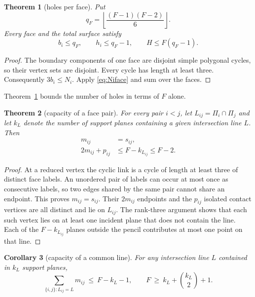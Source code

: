 \documentclass[11pt,a4paper]{article}
\newtheorem{theorem}{Theorem}[section]
\newtheorem{corollary}[theorem]{Corollary}
\theoremstyle{definition}
\begin{document}
\begin{theorem}[holes per face]\label{thm:arr-holes}
Put
\[
  q_F=\left\lfloor\frac{(F-1)(F-2)}6\right\rfloor.
\]
Every face and the total surface satisfy
\begin{equation}\label{eq:arr-holes}
  b_i\leq q_F,
  \qquad
  h_i\leq q_F-1,
  \qquad
  H\leq F(q_F-1).
\end{equation}
\end{theorem}

\begin{proof}
The boundary components of one face are disjoint simple polygonal cycles, so
their vertex sets are disjoint.  Every cycle has length at least three.
Consequently $3b_i\leq N_i$.  Apply \eqref{eq:Niface} and sum over the
faces.
\end{proof}

Theorem~\ref{thm:arr-holes} bounds the number of holes in terms of $F$ alone.

\begin{theorem}[capacity of a face pair]\label{thm:paircapacity}
For every pair $i<j$, let $L_{ij}=\Pi_i\cap\Pi_j$ and let $k_L$ denote the
number of support planes containing a given intersection line $L$. Then
\begin{align}
  m_{ij}&=s_{ij},\label{eq:edgepair}\\
  2m_{ij}+p_{ij}&\leq F-k_{L_{ij}}\leq F-2.\label{eq:contactcapacity}
\end{align}
\end{theorem}

\begin{proof}
At a reduced vertex the cyclic link is a cycle of length at least three of
distinct face labels. An unordered pair of labels can occur at most once as
consecutive labels, so two edges shared by the same pair cannot share an
endpoint. This proves $m_{ij}=s_{ij}$. Their $2m_{ij}$ endpoints and the
$p_{ij}$ isolated contact vertices are all distinct and lie on $L_{ij}$.
The rank-three argument shows that each such vertex lies on at least one
incident plane that does not contain the line. Each of the $F-k_{L_{ij}}$
planes outside the pencil contributes at most one point on that line.
\end{proof}

\begin{corollary}[capacity of a common line]\label{cor:pencil}
For any intersection line $L$ contained in $k_L$ support planes,
\[
  \sum_{\{i,j\}:L_{ij}=L}m_{ij}\ \leq\ F-k_L-1,
  \qquad
  F\ \geq\ k_L+\binom{k_L}{2}+1.
\]
\end{corollary}
\end{document}
